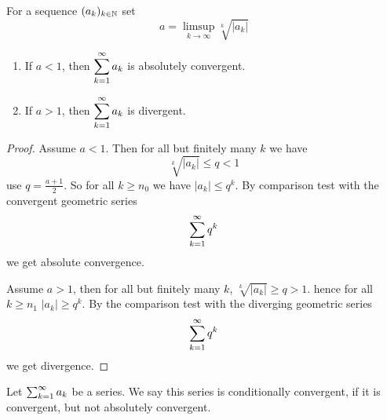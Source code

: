 \begin{theorem}\label{thm:sum_root_test}
    For a sequence $\dseq[k]{a}$ set
    \[
    a = \limsup_{k \to \infty}\sqrt[k]{|a_k|}
    \]
    \begin{enumerate}[label = (\alph*)]
        \item If $a < 1$,
        then $\displaystyle\infsum[k = 1]a_k$ is absolutely convergent.
        \item If $a > 1$,
        then $\displaystyle\infsum[k = 1]a_k$ is divergent.
    \end{enumerate}
\end{theorem}
\begin{proof}
    Assume $a < 1$.
    Then for all but finitely many $k$ we have
    \[
    \sqrt[k]{|a_k|} \leq q < 1
    \]
    use $q = \frac{a + 1}{2}$.
    So for all $k \geq n_0$ we have $|a_k| \leq q ^ k$.
    By comparison test with the convergent geometric series
    \[
    \infsum[k = 1]q ^ k
    \]
    we get absolute convergence.

    Assume $a > 1$,
    then for all but finitely many $k$,
    $\sqrt[k]{|a_k|} \geq q > 1$.
    hence for all $k \geq n_1$ $|a_k| \geq q ^ k$.
    By the comparison test with the diverging geometric series
    \[
    \infsum[k = 1]q ^ k
    \]
    we get divergence.
\end{proof}

\begin{definition}\label{def:cond_sum}
    Let $\infsum a_k$ be a series.
    We say this series is conditionally convergent,
    if it is convergent,
    but not absolutely convergent.
\end{definition}